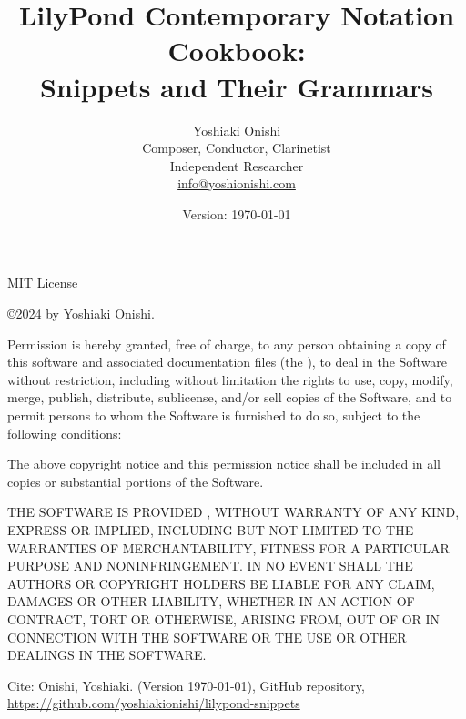 \documentclass[11pt, oneside]{book}   	%
\title{LilyPond Contemporary Notation Cookbook: \\ Snippets and Their Grammars}
\author{Yoshiaki Onishi\\Composer, Conductor, Clarinetist\\Independent Researcher\\ \href{mailto:info@yoshionishi.com}{info@yoshionishi.com}}
\date{Version: \today}
\begin{document}
\maketitle


MIT License

\copyright 2024 by Yoshiaki Onishi. 

Permission is hereby granted, free of charge, to any person obtaining a copy of this software and associated documentation files (the ), to deal in the Software without restriction, including without limitation the rights to use, copy, modify, merge, publish, distribute, sublicense, and/or sell copies of the Software, and to permit persons to whom the Software is furnished to do so, subject to the following conditions:

The above copyright notice and this permission notice shall be included in all copies or substantial portions of the Software.

THE SOFTWARE IS PROVIDED , WITHOUT WARRANTY OF ANY KIND, EXPRESS OR IMPLIED, INCLUDING BUT NOT LIMITED TO THE WARRANTIES OF MERCHANTABILITY, FITNESS FOR A PARTICULAR PURPOSE AND NONINFRINGEMENT. IN NO EVENT SHALL THE AUTHORS OR COPYRIGHT HOLDERS BE LIABLE FOR ANY CLAIM, DAMAGES OR OTHER LIABILITY, WHETHER IN AN ACTION OF CONTRACT, TORT OR OTHERWISE, ARISING FROM, OUT OF OR IN CONNECTION WITH THE SOFTWARE OR THE USE OR OTHER DEALINGS IN THE SOFTWARE.

\hfill \break
Cite: Onishi, Yoshiaki.  (Version \today), GitHub repository, \href{https://github.com/yoshiakionishi/lilypond-snippets}{https://github.com/yoshiakionishi/lilypond-snippets} %


\frontmatter
\tableofcontents
\label{sec:toc}





\mainmatter










\end{document}
